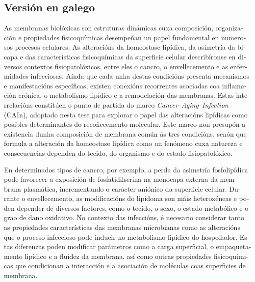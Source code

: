 \begin{otherlanguage}{galician}
\subsection*{Versión en galego}
{}
As membranas biolóxicas son estruturas dinámicas cuxa composición, organización e propiedades fisicoquímicas desempeñan un papel fundamental en numerosos procesos celulares. As alteracións da homeostase lipídica, da asimetría da bicapa e das características fisicoquímicas da superficie celular describíronse en diversos contextos fisiopatolóxicos, entre eles o cancro, o envellecemento e as enfermidades infecciosas. Aínda que cada unha destas condicións presenta mecanismos e manifestacións específicas, existen conexións recorrentes asociadas coa inflamación crónica, o metabolismo lipídico e a remodelación das membranas. Estas interrelacións constitúen o punto de partida do marco \textit{Cancer–Aging–Infection} (CAIn), adoptado nesta tese para explorar o papel das alteracións lipídicas como posibles determinantes do recoñecemento molecular. Este marco non presupón a existencia dunha composición de membrana común ás tres condicións, senón que formula a alteración da homeostase lipídica como un fenómeno cuxa natureza e consecuencias dependen do tecido, do organismo e do estado fisiopatolóxico.

En determinados tipos de cancro, por exemplo, a perda da asimetría fosfolipídica pode favorecer a exposición de fosfatidilserina na monocapa externa da membrana plasmática, incrementando o carácter aniónico da superficie celular. Durante o envellecemento, as modificacións do lipidoma son máis heteroxéneas e poden depender de diversos factores, como o tecido, o sexo, o estado metabólico e o grao de dano oxidativo. No contexto das infeccións, é necesario considerar tanto as propiedades características das membranas microbianas como as alteracións que o proceso infeccioso pode inducir no metabolismo lipídico do hospedador. Estas diferenzas poden modificar parámetros como a carga superficial, o empaquetamento lipídico e a fluidez da membrana, así como outras propiedades fisicoquímicas que condicionan a interacción e a asociación de moléculas coas superficies de membrana.


\end{otherlanguage}
